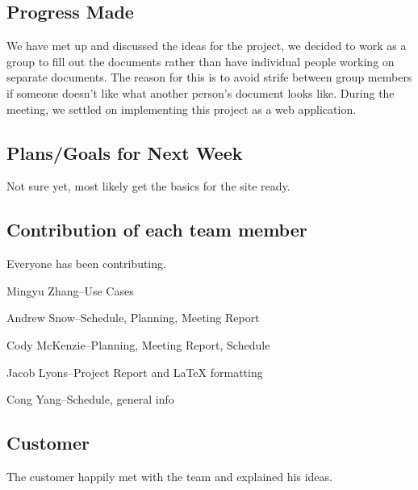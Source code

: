 \documentclass[12pt]{article}
\begin{document}
		\subsection{Progress Made}

We have met up and discussed the ideas for the project, we decided to work as a group to fill out the documents rather than have individual people working on separate documents. The reason for this is to avoid strife between group members if someone doesn’t like what another person's document looks like. During the meeting, we settled on implementing this project as a web application.

		\subsection{Plans/Goals for Next Week}

Not sure yet, most likely get the basics for the site ready.


		\subsection{Contribution of each team member}
Everyone has been contributing. \par
Mingyu Zhang--Use Cases \par
Andrew Snow--Schedule, Planning, Meeting Report \par
Cody McKenzie--Planning, Meeting Report, Schedule \par
Jacob Lyons--Project Report and LaTeX formatting \par
Cong Yang--Schedule, general info



		\subsection{Customer}
The customer happily met with the team and explained his ideas.
\end{document}

